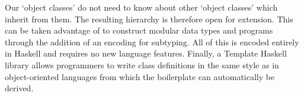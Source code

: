 Our `object classes' do not need to know about other `object classes' which inherit from them. The resulting hierarchy is therefore open for extension. This can be taken advantage of to construct modular data types and programs through the addition of an encoding for subtyping. All of this is encoded entirely in Haskell and requires no new language features. Finally, a Template Haskell library allows programmers to write class definitions in the same style as in object-oriented languages from which the boilerplate can automatically be derived.





